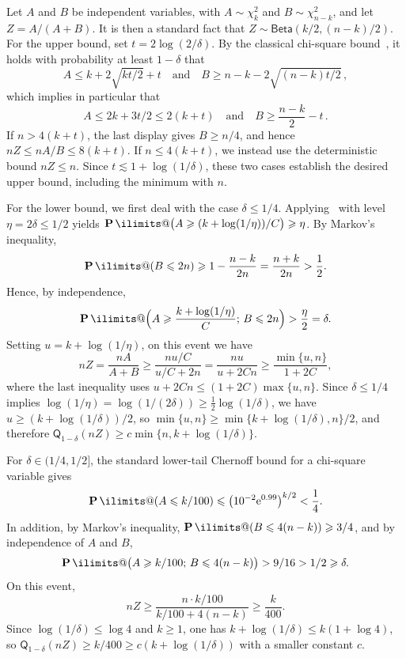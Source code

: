 \documentclass[11pt, letterpaper, hidelinks]{article}
\makeatletter
\renewcommand{\proofname}{\textit{\textbf{Proof}}}
\renewenvironment{proof}[1][\proofname]{\par\pushQED{\qed}\normalfont \topsep6\p@\@plus6\p@\relax\trivlist\item[\hskip\labelsep#1\@addpunct{}]\ignorespaces}{\popQED\endtrivlist\@endpefalse}
\newcommand{\e}{\mathrm{e}}
\newcommand{\1}{\mathbf 1}
\renewcommand{\leq}{\leqslant}
\renewcommand{\geq}{\geqslant}
\renewcommand{\P}{\operatorname*{\mathbf{P}}\ilimits@}
\theoremstyle{plain}
\theoremstyle{definition}
\newcommand{\Quant}[1]{\mathsf{Q}_{#1}}
\makeatother
\begin{document}
\begin{proof}[Proof of~\Cref{lem:beta-quantile}]

Let $A$ and $B$ be independent variables, with $A\sim\chi^2_k$ and $B \sim \chi^2_{n-k}$, and let $Z= A/(A+B)$. It is then a standard fact that $Z \sim \mathsf{Beta}(k/2, (n-k)/2)$. For the upper bound, set $t=2\log(2/\delta)$. By the classical chi-square bound~\cite[Lemma~1]{LauMas2000}, it holds with probability at least $1-\delta$ that
\begin{equation}
	A \leq k + 2\sqrt{kt/2} + t  \quad \text{and} \quad B \geq n-k - 2\sqrt{(n-k)t/2} \, ,
\end{equation}
which implies in particular that
\begin{equation}
	A \leq 2 k + 3t/2 \leq 2(k+t)  \quad \text{and} \quad B \geq \frac{n-k}{2} - t \, .
\end{equation}
If $n>4(k+t)$, the last display gives $B\geq n/4$, and hence
$nZ\leq nA/B\leq8(k+t)$. If $n\leq4(k+t)$, we instead use the deterministic
bound $nZ\leq n$. Since $t\lesssim1+\log(1/\delta)$, these two cases establish
the desired upper bound, including the minimum with $n$.

For the lower bound, we first deal with the case $\delta \leq 1/4$.
Applying~ with level $\eta = 2\delta \leq 1/2$ yields
$\P\bigl(A \geq (k+\log(1/\eta))/C\bigr) \geq \eta$.
By Markov's inequality,
\[
\P(B\leq2n)\geq1-\frac{n-k}{2n}=\frac{n+k}{2n}>\frac12.
\]
Hence, by independence,
\[
\P\Big(A \geq \frac{k+\log(1/\eta)}{C} ;\, B \leq 2n\Big) > \frac{\eta}{2} = \delta.
\]
Setting $u = k + \log(1/\eta)$, on this event we have
\[
nZ = \frac{nA}{A+B} \geq \frac{nu/C}{u/C+2n} = \frac{nu}{u+2Cn} \geq \frac{\min\{u,n\}}{1+2C},
\]
where the last inequality uses $u + 2Cn \leq (1+2C)\max\{u,n\}$.
Since $\delta \leq 1/4$ implies $\log(1/\eta) = \log(1/(2\delta)) \geq \frac{1}{2}\log(1/\delta)$, we have $u \geq (k+\log(1/\delta))/2$, so $\min\{u, n\} \geq \min\{k+\log(1/\delta), n\}/2$, and therefore $\Quant{1-\delta}(nZ) \geq c \min\{n, k+\log(1/\delta)\}$.

For $\delta \in (1/4, 1/2]$, the standard lower-tail Chernoff bound for a chi-square variable gives
\[
\P(A\leq k/100)
\leq \bigl(10^{-2}\e^{0.99}\bigr)^{k/2}<\frac14.
\]
In addition, by Markov's inequality, $\P(B \leq 4(n-k)) \geq 3/4$, and by independence of $A$ and $B$,
\[
\P\bigl(A \geq k/100 ;\, B \leq 4(n-k)\bigr) > 9/16 > 1/2 \geq \delta.
\]
On this event,
\[
nZ \geq \frac{n \cdot k/100}{k/100 + 4(n-k)} \geq \frac{k}{400}.
\]
Since $\log(1/\delta) \leq \log 4$ and $k \geq 1$, one has $k + \log(1/\delta) \leq k(1+\log 4)$, so $\Quant{1-\delta}(nZ) \geq k/400 \geq c(k+\log(1/\delta))$ with a smaller constant $c$.
\end{proof}
\end{document}
